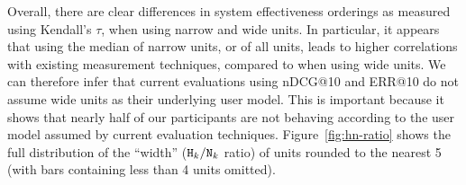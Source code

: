Overall, there are clear differences in system effectiveness orderings
as measured using Kendall's $\tau$,
when using narrow and wide units.
In particular, it appears that using the median of narrow units, or of
all units, leads to higher correlations with existing measurement
techniques, compared to when using wide units.
We can therefore infer that current evaluations using nDCG@10 and ERR@10
do not assume wide units as their underlying user model.
This is important because it shows that nearly half of our
participants are not behaving according to the user model assumed by
current evaluation techniques.
Figure~\ref{fig:hn-ratio} shows the full distribution of the ``width''
($\mbox{{\tt H$_k$}}/\mbox{{\tt N$_k$}}$ ratio) of units rounded to the nearest 5 
(with bars containing less than 4 units omitted).

